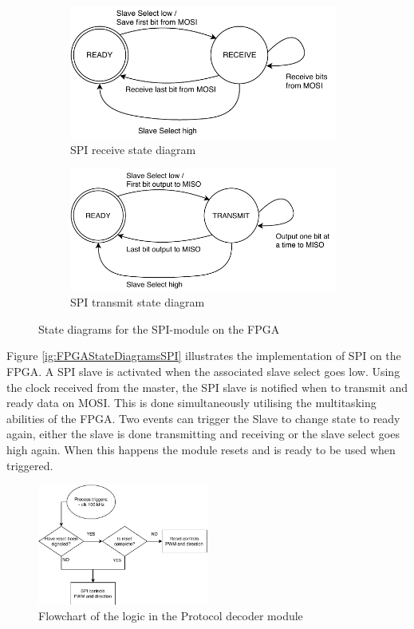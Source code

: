 \documentclass[../../main.tex]{subfiles}
\begin{document}
\begin{figure}[h]
\begin{subfigure}{0.48\textwidth}
    \includegraphics[width = 0.97\textwidth]{Sections/System_Implementation/Images/FPGAStateDiagramReceiveSPI.pdf}
    \caption{SPI receive state diagram}
    \label{subfig:FPGAStateDiagramReceiveSPI}
\end{subfigure}\quad
\begin{subfigure}{0.48\textwidth}
    \includegraphics[width = 0.97\textwidth]{Sections/System_Implementation/Images/FPGAStateDiagramTransmitSPI.pdf}
    \caption{SPI transmit state diagram}
    \label{subfig:FPGAStateDiagramTransmitSPI}
\end{subfigure}
\caption{State diagrams for the SPI-module on the FPGA}
\label{fig:FPGAStateDiagramsSPI}
\end{figure}

\clearpage

Figure \ref{ig:FPGAStateDiagramsSPI} illustrates the implementation of SPI on the FPGA. A SPI slave is activated when the associated slave select goes low. Using the clock received from the master, the SPI slave is notified when to transmit and ready data on MOSI. This is done simultaneously utilising the multitasking abilities of the FPGA. Two events can trigger the Slave to change state to ready again, either the slave is done transmitting and receiving or the slave select goes high again. When this happens the module resets and is ready to be used when triggered.

\begin{figure}[]
    \centering
    \includegraphics[width=0.5\textwidth]{Sections/System_Implementation/Images/FPGAflowcharts-protocol.pdf}
    \caption{Flowchart of the logic in the Protocol decoder module}
    \label{fig:ProtocolDecoderLogic}
\end{figure}
\end{document}
